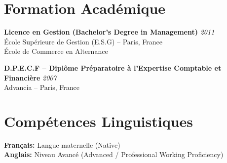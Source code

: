 \documentclass[11pt,a4paper]{article}
\begin{document}
\section*{Formation Académique}

\textbf{Licence en Gestion (Bachelor's Degree in Management)} \hfill \textit{2011}\\
École Supérieure de Gestion (E.S.G) -- Paris, France\\
École de Commerce en Alternance

\textbf{D.P.E.C.F -- Diplôme Préparatoire à l'Expertise Comptable et Financière} \hfill \textit{2007}\\
Advancia -- Paris, France

\section*{Compétences Linguistiques}

\textbf{Français:} Langue maternelle (Native)\\
\textbf{Anglais:} Niveau Avancé (Advanced / Professional Working Proficiency)
\end{document}
